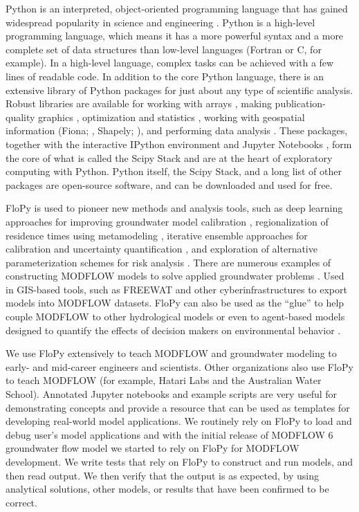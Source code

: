 \documentclass[11pt, oneside]{article}  	%
\begin{document}
Python is an interpreted, object-oriented programming language that has gained widespread popularity in science and engineering \citep{perez2010python}. Python is a high-level programming language, which means it has a more powerful syntax and a more complete set of data structures than low-level languages (Fortran or C, for example). In a high-level language, complex tasks can be achieved with a few lines of readable code. In addition to the core Python language, there is an extensive library of Python packages for just about any type of scientific analysis. Robust libraries are available for working with arrays \citep[Numpy;][]{2020NumPy-Array}, making publication-quality graphics \citep[Matplotlib;][]{hunter2007matplotlib}, optimization and statistics \cite[Scipy;][]{2020SciPy-NMeth}, working with geospatial information (Fiona; \citealp{fiona-gillies}, Shapely; \citealp{shapely-gillies}), and performing data analysis \citep[Pandas;][]{mckinney2011pandas}. These packages, together with the interactive IPython environment \citep{perez2007ipython} and Jupyter Notebooks \citep{Kluyver:2016aa}, form the core of what is called the Scipy Stack and are at the heart of exploratory computing with Python. Python itself, the Scipy Stack, and a long list of other packages are open-source software, and can be downloaded and used for free.

FloPy is used to pioneer new methods and analysis tools, such as deep learning approaches for improving groundwater model calibration \citep{sun2018, zhou2021}, regionalization of residence times using metamodeling \citep{starn2018}, iterative ensemble approaches for calibration and uncertainty quantification \citep{white2018ies}, and exploration of alternative parameterization schemes for risk analysis \citep{knowling2019}. There are numerous examples of constructing MODFLOW models to solve applied groundwater problems \citep{befus2017, vanengelen2018, ebeling2019, zipper2019, befus2020}. Used in GIS-based tools, such as FREEWAT \citep{freewat2018} and other cyberinfrastructures \citep{essawy2018} to export models into MODFLOW datasets. FloPy can also be used as the ``glue'' to help couple MODFLOW to other hydrological models \citep{burek2020} or even to agent-based models designed to quantify the effects of decision makers on environmental behavior \citep{jaxarozen2019}. 

We use FloPy extensively to teach MODFLOW and groundwater modeling to early- and mid-career engineers and scientists. Other organizations also use FloPy to teach MODFLOW (for example, Hatari Labs and the Australian Water School). Annotated Jupyter notebooks and example scripts are very useful for demonstrating concepts and provide a resource that can be used as templates for developing real-world model applications. We routinely rely on FloPy to load and debug user's model applications and with the initial release of MODFLOW 6 groundwater flow model \citep{modflow6gwf} we started to rely on FloPy for MODFLOW development. We write tests that rely on FloPy to construct and run models, and then read output. We then verify that the output is as expected, by using analytical solutions, other models, or results that have been confirmed to be correct.
\end{document}
